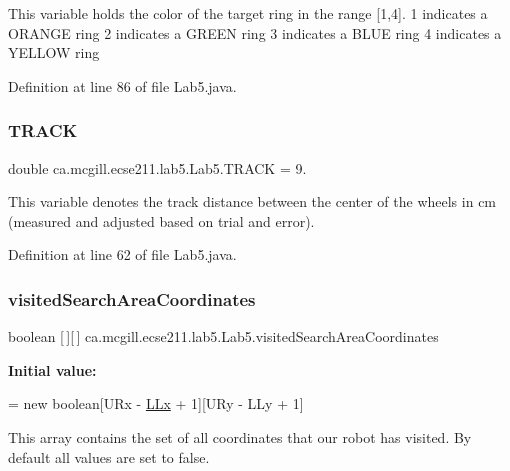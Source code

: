 This variable holds the color of the target ring in the range \mbox{[}1,4\mbox{]}. 1 indicates a O\+R\+A\+N\+GE ring 2 indicates a G\+R\+E\+EN ring 3 indicates a B\+L\+UE ring 4 indicates a Y\+E\+L\+L\+OW ring 

Definition at line 86 of file Lab5.\+java.

\mbox{\label{classca_1_1mcgill_1_1ecse211_1_1lab5_1_1_lab5_a401ed72b19795f01e72c8d2a69d9faba}} 
\subsubsection{\texorpdfstring{T\+R\+A\+CK}{TRACK}}
{\footnotesize\ttfamily double ca.\+mcgill.\+ecse211.\+lab5.\+Lab5.\+T\+R\+A\+CK = 9.\hspace{0.3cm}{\ttfamily [static]}}

This variable denotes the track distance between the center of the wheels in cm (measured and adjusted based on trial and error). 

Definition at line 62 of file Lab5.\+java.

\mbox{\label{classca_1_1mcgill_1_1ecse211_1_1lab5_1_1_lab5_a27ae00bb6fbeed54573af9cc5c3dc32e}} 
\subsubsection{\texorpdfstring{visited\+Search\+Area\+Coordinates}{visitedSearchAreaCoordinates}}
{\footnotesize\ttfamily boolean \mbox{[}$\,$\mbox{]}\mbox{[}$\,$\mbox{]} ca.\+mcgill.\+ecse211.\+lab5.\+Lab5.\+visited\+Search\+Area\+Coordinates\hspace{0.3cm}{\ttfamily [static]}}

{\bfseries Initial value\+:}
\begin{DoxyCode}
=
      \textcolor{keyword}{new} \textcolor{keywordtype}{boolean}[URx - \hyperlink{classca_1_1mcgill_1_1ecse211_1_1lab5_1_1_lab5_a957a526ed669e9d8b7fc485e21385ee9}{LLx} + 1][URy - LLy + 1]
\end{DoxyCode}
This array contains the set of all coordinates that our robot has visited. By default all values are set to false. 

